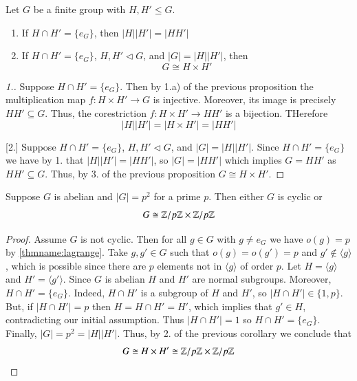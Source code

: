 \documentclass[12pt, a4paper, oneside, openright, titlepage]{book}
\begin{document}
\begin{cor}
        Let $G$ be a finite group with $H,H' \leq G$. \begin{enumerate}
                \item If $H \cap H' = \{e_G\}$, then $|H||H'| = |HH'|$
                \item If $H \cap H' = \{e_G\}$, $H,H' \vartriangleleft G$, and $|G| = |H||H'|$, then \begin{equation}
                                G \cong H \times H'
                \end{equation}
        \end{enumerate}
\end{cor}
\begin{proof}
        [1.] Suppose $H \cap H' = \{e_G\}$. Then by 1.a) of the previous proposition the multiplication map $f:H\times H' \rightarrow G$ is injective. Moreover, its image is precisely $HH' \subseteq G$. Thus, the corestriction $f:H\times H' \rightarrow HH'$ is a bijection. THerefore \begin{equation}
                |H||H'| = |H\times H'| = |HH'|
        \end{equation}

        [2.] Suppose $H \cap H' = \{e_G\}$, $H,H' \vartriangleleft G$, and $|G| = |H||H'|$. Since $H \cap H' = \{e_G\}$ we have by 1. that $|H||H'| = |HH'|$, so $|G| = |HH'|$ which implies $G = HH'$ as $HH' \subseteq G$. Thus, by 3. of the previous proposition $G \cong H \times H'$.
\end{proof}


\begin{rmk}[Application]
        Suppose $G$ is abelian and $|G| = p^2$ for a prime $p$. Then either $G$ is cyclic or \begin{equation}
                G \cong \mathbb Z/p\mathbb Z\times \mathbb Z/p\mathbb Z
        \end{equation}
\end{rmk}
\begin{proof}
        Assume $G$ is not cyclic. Then for all $g \in G$ with $g \neq e_G$ we have $o(g) = p$ by \ref{thmname:lagrange}. Take $g,g' \in G$ such that $o(g) = o(g') = p$ and $g' \notin \langle g\rangle$, which is possible since there are $p$ elements not in $\langle g \rangle$ of order $p$. Let $H = \langle g \rangle$ and $H' = \langle g' \rangle$. Since $G$ is abelian $H$ and $H'$ are normal subgroups. Moreover, $H \cap H' = \{e_G\}$. Indeed, $H\cap H'$ is a subgroup of $H$ and $H'$, so $|H\cap H'| \in \{1,p\}$. But, if $|H\cap H'| = p$ then $H = H \cap H' = H'$, which implies that $g' \in H$, contradicting our initial assumption. Thus $|H \cap H'| = 1$ so $H\cap H' = \{e_G\}$. Finally, $|G| = p^2 = |H||H'|$. Thus, by 2. of the previous corollary we conclude that \begin{equation}
                G \cong H \times H' \cong \mathbb Z/p\mathbb Z \times \mathbb Z/p\mathbb Z
        \end{equation}
\end{proof}
\end{document}
